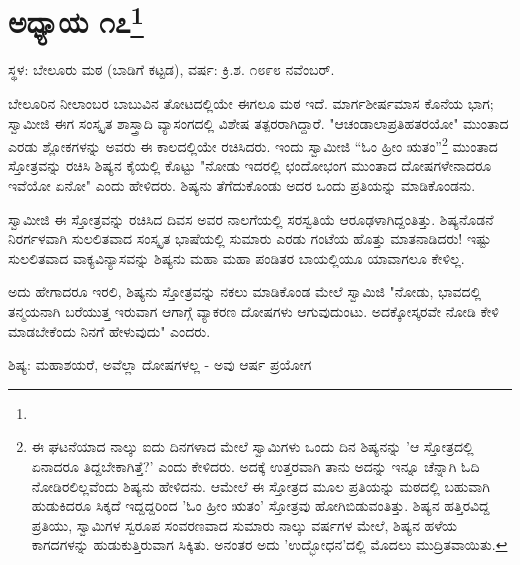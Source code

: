 \newpage

\chapter[ಅಧ್ಯಾಯ ೧೭]{ಅಧ್ಯಾಯ ೧೭\protect\footnote{}}

\begin{center}
ಸ್ಥಳ: ಬೇಲೂರು ಮಠ (ಬಾಡಿಗೆ ಕಟ್ಟಡ), ವರ್ಷ: ಕ್ರಿ.ಶ. ೧೮೯೮ ನವೆಂಬರ್.
\end{center}

ಬೇಲೂರಿನ ನೀಲಾಂಬರ ಬಾಬುವಿನ ತೋಟದಲ್ಲಿಯೇ ಈಗಲೂ ಮಠ ಇದೆ. ಮಾರ್ಗಶೀರ್ಷಮಾಸ ಕೊನೆಯ ಭಾಗ; ಸ್ವಾಮೀಜಿ ಈಗ ಸಂಸ್ಕೃತ ಶಾಸ್ತ್ರಾದಿ ವ್ಯಾಸಂಗದಲ್ಲಿ ವಿಶೇಷ ತತ್ಪರರಾಗಿದ್ದಾರೆ. "ಆಚಂಡಾಲಾಪ್ರತಿಹತರಯೋ" ಮುಂತಾದ ಎರಡು ಶ್ಲೋಕಗಳನ್ನು ಅವರು ಈ ಕಾಲದಲ್ಲಿಯೇ ರಚಿಸಿದರು. ಇಂದು ಸ್ವಾಮೀಜಿ “ಓಂ ಹ್ರೀಂ ಋತಂ”\footnote{ಈ ಘಟನೆಯಾದ ನಾಲ್ಕು ಐದು ದಿನಗಳಾದ ಮೇಲೆ ಸ್ವಾಮಿಗಳು ಒಂದು ದಿನ ಶಿಷ್ಯನನ್ನು 'ಆ ಸ್ತೋತ್ರದಲ್ಲಿ ಏನಾದರೂ ತಿದ್ದಬೇಕಾಗಿತ್ತೆ?' ಎಂದು ಕೇಳಿದರು. ಅದಕ್ಕೆ ಉತ್ತರವಾಗಿ ತಾನು ಅದನ್ನು ಇನ್ನೂ ಚೆನ್ನಾಗಿ ಓದಿ ನೋಡಿರಲಿಲ್ಲವೆಂದು ಶಿಷ್ಯನು ಹೇಳಿದನು. ಆಮೇಲೆ ಈ ಸ್ತೋತ್ರದ ಮೂಲ ಪ್ರತಿಯನ್ನು ಮಠದಲ್ಲಿ ಬಹುವಾಗಿ ಹುಡುಕಿದರೂ ಸಿಕ್ಕದೆ ಇದ್ದದ್ದರಿಂದ 'ಓಂ ಹ್ರೀಂ ಋತಂ' ಸ್ತೋತ್ರವು ಹೋಗಿಬಿಡುವಂತಿತ್ತು. ಶಿಷ್ಯನ ಹತ್ತಿರವಿದ್ದ ಪ್ರತಿಯು, ಸ್ವಾಮಿಗಳ ಸ್ವರೂಪ ಸಂವರಣವಾದ ಸುಮಾರು ನಾಲ್ಕು ವರ್ಷಗಳ ಮೇಲೆ, ಶಿಷ್ಯನ ಹಳೆಯ ಕಾಗದಗಳನ್ನು ಹುಡುಕುತ್ತಿರುವಾಗ ಸಿಕ್ಕಿತು. ಅನಂತರ ಅದು 'ಉದ್ಭೋಧನ'ದಲ್ಲಿ ಮೊದಲು ಮುದ್ರಿತವಾಯಿತು.} ಮುಂತಾದ ಸ್ತೋತ್ರವನ್ನು ರಚಿಸಿ ಶಿಷ್ಯನ ಕೈಯಲ್ಲಿ ಕೊಟ್ಟು "ನೋಡು ಇದರಲ್ಲಿ ಛಂದೋಭಂಗ ಮುಂತಾದ ದೋಷಗಳೇನಾದರೂ ಇವೆಯೋ ಏನೋ" ಎಂದು ಹೇಳಿದರು. ಶಿಷ್ಯನು ತೆಗೆದುಕೊಂಡು ಅದರ ಒಂದು ಪ್ರತಿಯನ್ನು ಮಾಡಿಕೊಂಡನು.

ಸ್ವಾಮೀಜಿ ಈ ಸ್ತೋತ್ರವನ್ನು ರಚಿಸಿದ ದಿವಸ ಅವರ ನಾಲಗೆಯಲ್ಲಿ ಸರಸ್ವತಿಯೆ ಆರೂಢಳಾಗಿದ್ದಂತಿತ್ತು. ಶಿಷ್ಯನೊಡನೆ ನಿರರ್ಗಳವಾಗಿ ಸುಲಲಿತವಾದ ಸಂಸ್ಕೃತ ಭಾಷೆಯಲ್ಲಿ ಸುಮಾರು ಎರಡು ಗಂಟೆಯ ಹೊತ್ತು ಮಾತನಾಡಿದರು! ಇಷ್ಟು ಸುಲಲಿತವಾದ ವಾಕ್ಯವಿನ್ಯಾಸವನ್ನು ಶಿಷ್ಯನು ಮಹಾ ಮಹಾ ಪಂಡಿತರ ಬಾಯಲ್ಲಿಯೂ ಯಾವಾಗಲೂ ಕೇಳಿಲ್ಲ.

ಅದು ಹೇಗಾದರೂ ಇರಲಿ, ಶಿಷ್ಯನು ಸ್ತೋತ್ರವನ್ನು ನಕಲು ಮಾಡಿಕೊಂಡ ಮೇಲೆ ಸ್ವಾಮಿಜಿ "ನೋಡು, ಭಾವದಲ್ಲಿ ತನ್ಮಯನಾಗಿ ಬರೆಯುತ್ತ ಇರುವಾಗ ಆಗಾಗ್ಗೆ ವ್ಯಾಕರಣ ದೋಷಗಳು ಆಗುವುದುಂಟು. ಅದಕ್ಕೋಸ್ಕರವೇ ನೋಡಿ ಕೇಳಿ ಮಾಡಬೇಕೆಂದು ನಿನಗೆ ಹೇಳುವುದು" ಎಂದರು.

ಶಿಷ್ಯ: ಮಹಾಶಯರೆ, ಅವೆಲ್ಲಾ ದೋಷಗಳಲ್ಲ - ಅವು ಆರ್ಷ ಪ್ರಯೋಗ


